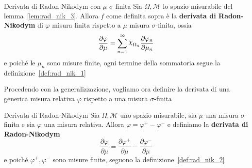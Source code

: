 \begin{definition}[label=def:rad_nik_2]{Derivata di Radon-Nikodym con \(\mu\)
    \(\sigma\)-finita}
    Sia \(\Omega, \mathcal{M}\) lo spazio misurabile del
    lemma~\ref{lem:rad_nik_3}. Allora \(f\) come definita sopra è la
    \textbf{derivata di Radon-Nikodym} di \(\varphi \) misura finita rispetto a
    \(\mu\) misura \(\sigma\)-finita, ossia
    \[
        \frac{\partial \varphi }{\partial \mu} = \sum_{n=1}^{\infty}
        \rchi_{\Omega_n} \frac{\partial \varphi_n}{\partial \mu_n}
    \]
    e poiché le \(\mu_n\) sono misure finite, ogni termine della sommatoria
    segue la definizione~\ref{def:rad_nik_1}

\end{definition}

Procedendo con la generalizzazione, vogliamo ora definire la derivata di una
generica misura relativa \(\varphi \) rispetto a una misura \(\sigma\)-finita

\begin{definition}[label=def:rad_nik]{Derivata di Radon-Nikodym}
    Sia \(\Omega, \mathcal{M}\) uno spazio misurabile, sia \(\mu\) una misura
    \(\sigma\)-finita e sia \(\varphi \) una misura relativa. Allora \(\varphi =
    \varphi^{+} - \varphi^{-}\) e definiamo la \textbf{derivata di Radon-Nikodym}
    \[
        \frac{\partial \varphi }{\partial \mu} = \frac{\partial \varphi^{+}}{\partial \mu} - \frac{\partial \varphi^{-}}{\partial \mu}
    \]
    e poiché \(\varphi^{+}, \varphi^{-}\) sono misure finite, seguono
    la definizione~\ref{def:rad_nik_2}
\end{definition}

